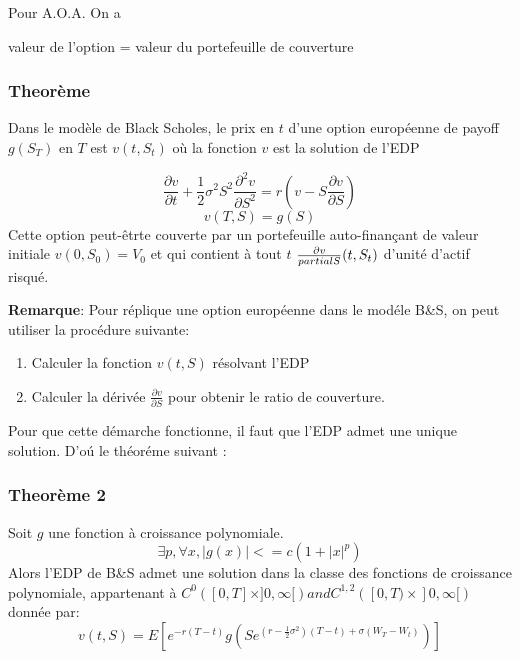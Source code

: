\documentclass{article}
\begin{document}
Pour A.O.A. On a

valeur de l'option = valeur du portefeuille de couverture

\subsubsection{Theor\`eme}
Dans le mod\`ele de Black Scholes, le prix en $t$ d'une option europ\'eenne de payoff $g(S_T)$ en $T$ est $v(t,S_t)$ o\`u la fonction $v$ est la solution de l'EDP

\begin{equation}
\frac{\partial v}{\partial t}+\frac{1}{2} \sigma^2 S^2 \frac{\partial^2 v}{\partial S^2}=r(v-S\frac{\partial v}{\partial S})
\end{equation}
\begin{equation}
v(T,S) = g(S)
\end{equation}
Cette option peut-\^etrte couverte par un portefeuille auto-finan\c{c}ant de valeur initiale $v(0,S_0)=V_0$ et qui contient \`a tout $t$ $\frac{\partial v}{\\partial S}(t,S_t)$ d'unit\'e d'actif risqu\'e.

\textbf{Remarque}: Pour r\'eplique une option europ\'eenne dans le mod\'ele B\&S, on peut utiliser la proc\'edure suivante:
\begin{enumerate}
\item Calculer la fonction $v(t,S)$ r\'esolvant l'EDP

\item Calculer la d\'eriv\'ee $\frac{\partial v}{\partial S}$ pour obtenir le ratio de couverture.
\end{enumerate}

Pour que cette d\'emarche fonctionne, il faut que l'EDP admet une unique solution. D'o\'u le th\'eor\'eme suivant :

\subsubsection{Theor\`eme 2}
Soit $g$ une fonction \`a croissance polynomiale.
\begin{equation}
\exists p, \forall x, |g(x)|<=c(1+|x|^p)
\end{equation}
Alors l'EDP de B\&S admet une solution dans la classe des fonctions de croissance polynomiale, appartenant \`a $C^0([0,T]\times ]0,\infty[) and C^{1,2}([0,T)\times]0,\infty[)$ donn\'ee par:
\begin{equation}
v(t,S)=E[e^{-r(T-t)}g(S e^{(r-\frac{1}{2}\sigma^2)(T-t)+\sigma (W_T -W_t)})]
\end{equation}
\end{document}
